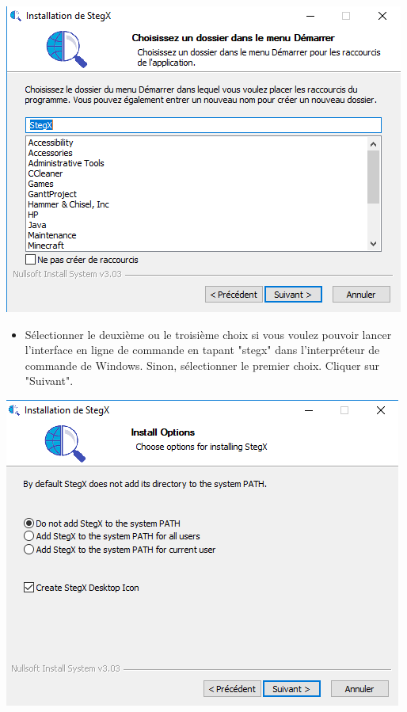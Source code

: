 \documentclass[11pt]{article}
\begin{document}
\hspace{1cm}
\includegraphics[scale=1]{pictures/debut.png}
\vspace{1cm}

\begin{itemize}
\item Sélectionner le deuxième ou le troisième choix si vous voulez pouvoir
    lancer l'interface en ligne de commande en tapant "stegx" dans
    l'interpréteur de commande de Windows. Sinon, sélectionner le premier
    choix. Cliquer sur "Suivant". 
\end{itemize}

\hspace{1cm}
\includegraphics[scale=1]{pictures/path.png}
\vspace{1cm}
\end{document}
